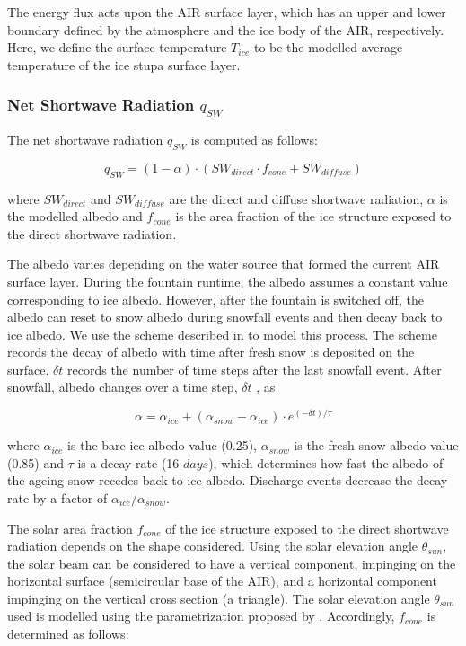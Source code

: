 The energy flux acts upon the AIR surface layer, which has an upper and lower boundary defined by the atmosphere
and the ice body of the AIR, respectively. Here, we define the surface temperature $T_{ice}$ to be the modelled
average temperature of the ice stupa surface layer.

\subsubsection{Net Shortwave Radiation \texorpdfstring{$q_{SW}$}{Lg}} \label{sec:SW}

The net shortwave radiation $q_{SW}$ is computed as follows:

\begin{equation} q_{SW} = (1- \alpha)\cdot (SW_{direct} \cdot f_{cone} + SW_{diffuse}) \label{eqn:SW} \end{equation}

where $SW_{direct}$ and $SW_{diffuse}$ are the direct and diffuse shortwave radiation, $\alpha$ is the
modelled albedo and $f_{cone}$ is the area fraction of the ice structure exposed to the direct shortwave
radiation.

The albedo varies depending on the water source that formed the current AIR surface layer. During the fountain
runtime, the albedo assumes a constant value corresponding to ice albedo. However, after the fountain is
switched off, the albedo can reset to snow albedo during snowfall events and then decay back to ice albedo. We
use the scheme described in \cite{oerlemansYearRecordGlobal1998} to model this process. The scheme records the
decay of albedo with time after fresh snow is deposited on the surface. $\delta t$ records the number of time
steps after the last snowfall event. After snowfall, albedo changes over a time step, $\delta t$ , as

\begin{equation} \alpha=\alpha_{ice}+(\alpha_{snow}-\alpha_{ice}) \cdot e^{(-\delta t)/\tau} \label{eqn:alb}
\end{equation}

where $\alpha_{ice}$ is the bare ice albedo value (0.25), $\alpha_{snow}$ is the fresh snow albedo value (0.85)
and $\tau$ is a decay rate (16 $days$), which determines how fast the albedo of the ageing snow recedes back to
ice albedo. Discharge events decrease the decay rate by a factor of $\alpha_{ice}/\alpha_{snow}$.

The solar area fraction $f_{cone}$ of the ice structure exposed to the direct shortwave radiation depends on the shape
considered. Using the solar elevation angle $\theta_{sun}$, the solar beam can be considered to have a vertical
component, impinging on the horizontal surface (semicircular base of the AIR), and a horizontal component
impinging on the vertical cross section (a triangle). The solar elevation angle $\theta_{sun}$ used is modelled
using the parametrization proposed by \cite{woolfComputationSolarElevation1968}. Accordingly, $f_{cone}$ is determined as follows:

